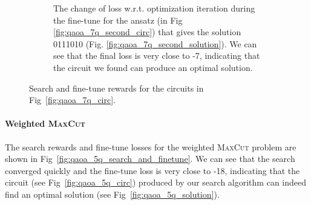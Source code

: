 \documentclass[a4paper,onecolumn,11pt]{quantumarticle}
\begin{document}
\begin{figure}[H]
\begin{subfigure}[b]{0.48\textwidth}
        \caption{The change of loss w.r.t. optimization iteration during the fine-tune for the ansatz (in Fig \ref{fig:qaoa_7q_second_circ}) that gives the solution 0111010 (Fig. \ref{fig:qaoa_7q_second_solution}). We can see that the final loss is very close to -7, indicating that the circuit we found can produce an optimal solution.}
        \label{fig:qaoa_finetune_2}
    \end{subfigure}
    \caption{Search and fine-tune rewards for the circuits in Fig~\ref{fig:qaoa_7q_circ}. }\label{fig:qaoa_7q_search_finetune_both}
\end{figure}



\paragraph{Weighted \textsc{MaxCut}}
The search rewards and fine-tune losses for the weighted \textsc{MaxCut} problem are shown in Fig~\ref{fig:qaoa_5q_search_and_finetune}. We can see that the search converged quickly and the fine-tune loss is very close to -18, indicating that the circuit (see Fig~\ref{fig:qaoa_5q_circ}) produced by our search algorithm can indeed find an optimal solution (see Fig~\ref{fig:qaoa_5q_solution}).
\end{document}

